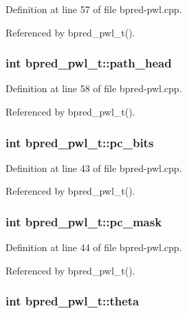 Definition at line 57 of file bpred-pwl.cpp.

Referenced by bpred\_\-pwl\_\-t().
\subsubsection[{path\_\-head}]{\setlength{\rightskip}{0pt plus 5cm}int {\bf bpred\_\-pwl\_\-t::path\_\-head}\hspace{0.3cm}{\tt  [protected]}}\label{classbpred__pwl__t_62b4d523d885300aa7b5d9e944dd4d7f}




Definition at line 58 of file bpred-pwl.cpp.

Referenced by bpred\_\-pwl\_\-t().
\subsubsection[{pc\_\-bits}]{\setlength{\rightskip}{0pt plus 5cm}int {\bf bpred\_\-pwl\_\-t::pc\_\-bits}\hspace{0.3cm}{\tt  [protected]}}\label{classbpred__pwl__t_5109178c5d0a673face4a88ea44d7fca}




Definition at line 43 of file bpred-pwl.cpp.

Referenced by bpred\_\-pwl\_\-t().
\subsubsection[{pc\_\-mask}]{\setlength{\rightskip}{0pt plus 5cm}int {\bf bpred\_\-pwl\_\-t::pc\_\-mask}\hspace{0.3cm}{\tt  [protected]}}\label{classbpred__pwl__t_57e3437e075a3f0444cf16a88995183b}




Definition at line 44 of file bpred-pwl.cpp.

Referenced by bpred\_\-pwl\_\-t().
\subsubsection[{theta}]{\setlength{\rightskip}{0pt plus 5cm}int {\bf bpred\_\-pwl\_\-t::theta}\hspace{0.3cm}{\tt  [protected]}}\label{classbpred__pwl__t_9813738942864cc854c51f17a04e2711}




